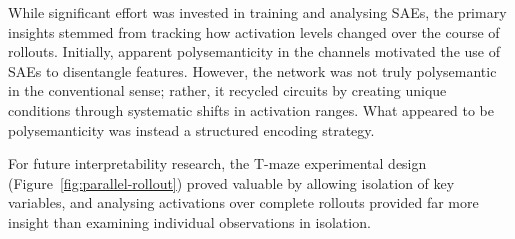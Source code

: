 While significant effort was invested in training and analysing SAEs, the primary insights stemmed from tracking how activation levels changed over the course of rollouts. Initially, apparent polysemanticity in the channels motivated the use of SAEs to disentangle features. However, the network was not truly polysemantic in the conventional sense; rather, it recycled circuits by creating unique conditions through systematic shifts in activation ranges. What appeared to be polysemanticity was instead a structured encoding strategy.

For future interpretability research, the T-maze experimental design (Figure~\ref{fig:parallel-rollout}) proved valuable by allowing isolation of key variables, and analysing activations over complete rollouts provided far more insight than examining individual observations in isolation.